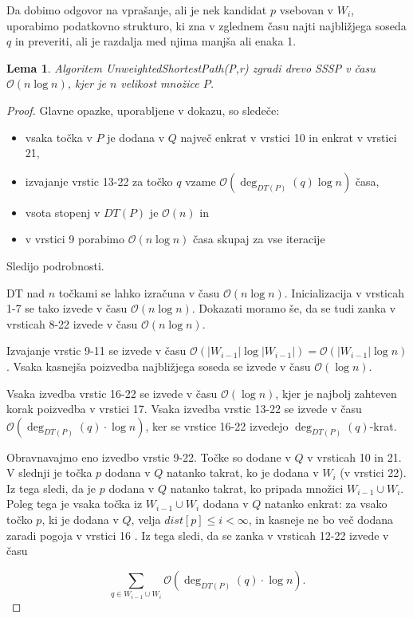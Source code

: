 \documentclass[a4paper, 12pt]{book}
\newcommand{\OO}{\ensuremath{\mathcal{O}}} %
\newtheorem{lema}[izrek]{Lema}
\begin{document}
Da dobimo odgovor na vprašanje, ali je nek kandidat $p$ vsebovan v $W_i$, uporabimo podatkovno strukturo, ki zna v zglednem času najti najbližjega soseda $q$ in preveriti, ali je razdalja med njima manjša ali enaka 1.

\begin{lema}
\label{lema3}
Algoritem \textit{Unweigh\-ted\-Shor\-test\-Path(P,r)} zgradi drevo SSSP v času $\OO(n\log n)$, kjer je $n$ velikost množice $P$.
\end{lema}

\begin{proof}
Glavne opazke, uporabljene v dokazu, so sledeče:
\begin{itemize}
\item vsaka točka v $P$ je dodana v $Q$ največ enkrat v vrstici 10 in enkrat v vrstici 21,
\item izvajanje vrstic 13-22 za točko $q$ vzame $\OO(\deg_{DT(P)}(q)\log n)$ časa,
\item vsota stopenj v $DT(P)$ je $\OO(n)$ in
\item v vrstici 9 porabimo $\OO(n\log n)$ časa skupaj za vse iteracije
\end{itemize}
Sledijo podrobnosti.

DT nad $n$ točkami se lahko izračuna v času $\OO(n\log n)$. Inicializacija v vrsticah 1-7 se tako izvede v času $\OO(n\log n)$. Dokazati moramo še, da se tudi zanka v vrsticah 8-22 izvede v času $\OO(n\log n)$.

Izvajanje vrstic 9-11 se izvede v času $\OO(|W_{i-1}|\log |W_{i-1}|) = \OO(|W_{i-1}|\log n)$. Vsaka kasnejša poizvedba najbližjega soseda se izvede v času $\OO(\log n)$.

Vsaka izvedba vrstic 16-22 se izvede v času $\OO(\log n)$, kjer je najbolj zahteven korak poizvedba v vrstici 17. Vsaka izvedba vrstic 13-22 se izvede v času $\OO(\deg_{DT(P)}(q)\cdot\log n)$, ker se vrstice 16-22 izvedejo $\deg_{DT(P)}(q)$-krat.

Obravnavajmo eno izvedbo vrstic 9-22. Točke so dodane v $Q$ v vrsticah 10 in 21. V slednji je točka $p$ dodana v $Q$ natanko takrat, ko je dodana v $W_i$ (v vrstici 22). Iz tega sledi, da je $p$ dodana v $Q$ natanko takrat, ko pripada množici $W_{i-1}\cup W_i$. Poleg tega je vsaka točka iz $W_{i-1}\cup W_i$ dodana v $Q$ natanko enkrat: za vsako točko $p$, ki je dodana v $Q$, velja $dist[p]\leq i < \infty$, in kasneje ne bo več dodana zaradi pogoja v vrstici 16
. Iz tega sledi, da se zanka v vrsticah 12-22 izvede v času

\begin{equation*}
\sum_{q\in W_{i-1}\cup W_i} \OO(\deg_{DT(P)}(q) \cdot \log n).
\end{equation*}


\end{proof}
\end{document}
